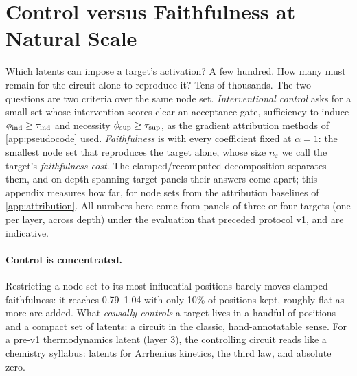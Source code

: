 \documentclass[10pt]{article}
\begin{document}
\section{Control versus Faithfulness at Natural Scale}
\label{sec:drivers-closure}

Which latents can impose a target's activation?
A few hundred.
How many must remain for the circuit alone to reproduce it?
Tens of thousands.
The two questions are two criteria over the same node set.
\emph{Interventional control} asks for a small set whose intervention scores clear an acceptance gate, sufficiency to induce $\phi_{\mathrm{ind}} \geq \tau_{\mathrm{ind}}$ and necessity $\phi_{\mathrm{sup}} \geq \tau_{\mathrm{sup}}$, as the gradient attribution methods of \cref{app:pseudocode} used.
\emph{Faithfulness} is  with every coefficient fixed at $\alpha = 1$: the smallest node set that reproduces the target alone, whose size $n_{\varepsilon}$ we call the target's \emph{faithfulness cost}.
The clamped/recomputed decomposition separates them, and on depth-spanning target panels their answers come apart; this appendix measures how far, for node sets from the attribution baselines of \cref{app:attribution}.
All numbers here come from panels of three or four targets (one per layer, across depth) under the evaluation that preceded protocol v1, and are indicative.

\paragraph{Control is concentrated.}
Restricting a node set to its most influential positions barely moves clamped faithfulness: it reaches 0.79--1.04 with only 10\% of positions kept, roughly flat as more are added.
What \emph{causally controls} a target lives in a handful of positions and a compact set of latents: a circuit in the classic, hand-annotatable sense.
For a pre-v1 thermodynamics latent (layer 3), the controlling circuit reads like a chemistry syllabus: latents for Arrhenius kinetics, the third law, and absolute zero.
\end{document}
